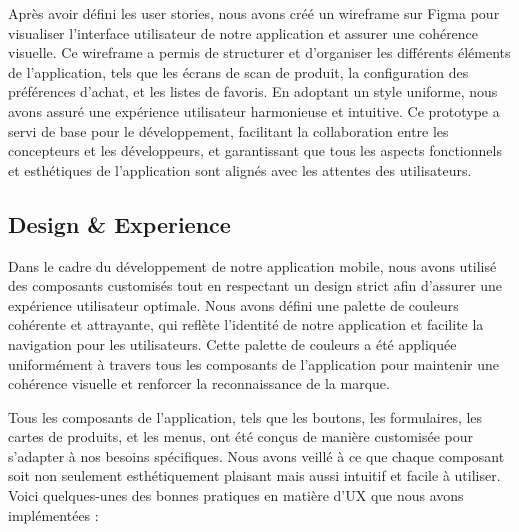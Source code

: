 Après avoir défini les user stories, nous avons créé un wireframe sur Figma pour visualiser l'interface utilisateur de notre application et assurer une cohérence visuelle. Ce wireframe a permis de structurer et d'organiser les différents éléments de l'application, tels que les écrans de scan de produit, la configuration des préférences d'achat, et les listes de favoris. En adoptant un style uniforme, nous avons assuré une expérience utilisateur harmonieuse et intuitive. Ce prototype a servi de base pour le développement, facilitant la collaboration entre les concepteurs et les développeurs, et garantissant que tous les aspects fonctionnels et esthétiques de l'application sont alignés avec les attentes des utilisateurs.

\subsection{Design \& Experience}

Dans le cadre du développement de notre application mobile, nous avons utilisé des composants customisés tout en respectant un design strict afin d'assurer une expérience utilisateur optimale. Nous avons défini une palette de couleurs cohérente et attrayante, qui reflète l'identité de notre application et facilite la navigation pour les utilisateurs. Cette palette de couleurs a été appliquée uniformément à travers tous les composants de l'application pour maintenir une cohérence visuelle et renforcer la reconnaissance de la marque.

Tous les composants de l'application, tels que les boutons, les formulaires, les cartes de produits, et les menus, ont été conçus de manière customisée pour s'adapter à nos besoins spécifiques. Nous avons veillé à ce que chaque composant soit non seulement esthétiquement plaisant mais aussi intuitif et facile à utiliser. Voici quelques-unes des bonnes pratiques en matière d'UX que nous avons implémentées :

